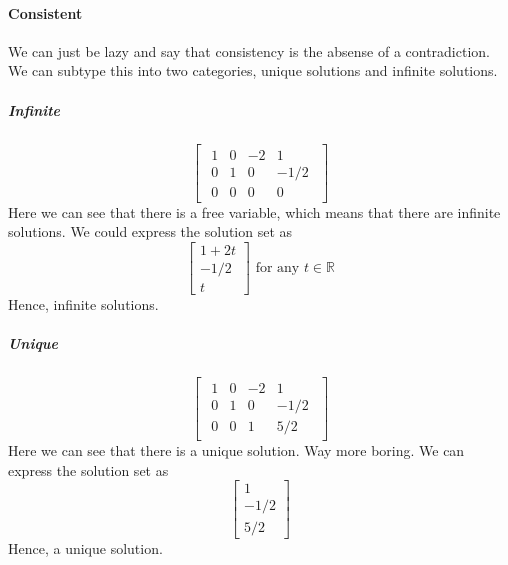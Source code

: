 \documentclass{article}
\begin{document}
            \paragraph{Consistent}
                We can just be lazy and say that consistency is the absense
                of a contradiction. We can subtype this into two categories,
                unique solutions and infinite solutions.
                \subparagraph{Infinite}
                    \[
                    \begin{bmatrix}
                    \begin{array}{ccc|c}
                        1 &  0 &  -2 & 1 \\
                        0 &  1 &  0 & -1/2 \\
                        0 &  0 &  0 & 0
                    \end{array}
                    \end{bmatrix}
                    \]
                    Here we can see that there is a free variable,
                    which means that there are infinite solutions.
                    We could express the solution set as
                    \[
                        \begin{bmatrix}
                            1 + 2t\\
                            -1/2\\
                            t
                        \end{bmatrix}
                        \text{ for any } t \in \mathbb{R}
                    \]
                    Hence, infinite solutions.
                \subparagraph{Unique}
                    \[
                    \begin{bmatrix}
                    \begin{array}{ccc|c}
                        1 &  0 &  -2 & 1 \\
                        0 &  1 &  0 & -1/2 \\
                        0 &  0 &  1 & 5/2
                    \end{array}
                    \end{bmatrix}
                    \]
                    Here we can see that there is a unique solution.
                    Way more boring.
                    We can express the solution set as
                    \[
                        \begin{bmatrix}
                            1\\
                            -1/2\\
                            5/2
                        \end{bmatrix}
                    \]
                    Hence, a unique solution.
\end{document}
